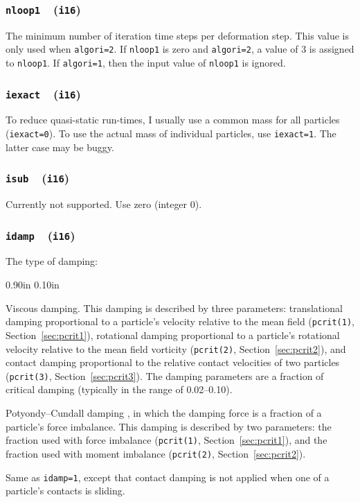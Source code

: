 \documentclass[letterpaper,11pt]{article}
\newcommand{\Var}[2]{\texttt{#1}\ \  (\texttt{#2})}
\newlength{\Labelwidth}
\newcommand{\Entrylabel}[1]{\makebox[\Labelwidth][r]{\texttt{#1}}}
\newenvironment{Options}
{\begin{list}{}{%
\renewcommand{\makelabel}{\Entrylabel}%
\setlength{\leftmargin} {0.90in}%
\setlength{\rightmargin}{0.00in}%
\setlength{\labelsep}   {0.10in}%
\setlength{\labelwidth} {\Labelwidth}%
}}
{\end{list}}
\begin{document}
\subsubsection[\texttt{nloop1}]{\Var{nloop1}{i16}}\label{sec:nloop1}
The minimum number of iteration time steps per deformation step.  
This value is only used when \texttt{algori=2}.  If \texttt{nloop1}
is zero and \texttt{algori=2}, a value of 3 is assigned to \texttt{nloop1}.
If \texttt{algori=1}, then the input value of \texttt{nloop1} is ignored.
%
\subsubsection[\texttt{iexact}]{\Var{iexact}{i16}}\label{sec:iexact}
To reduce quasi-static run-times,
I usually use a common mass for all particles (\texttt{iexact=0}).
To use the actual mass of individual particles,
use \texttt{iexact=1}.
The latter case may be buggy.
%
\subsubsection[\texttt{isub}]{\Var{isub}{i16}}\label{sec:isub}
Currently not supported.
Use zero (integer 0).
%
\subsubsection[\texttt{idamp}]{\Var{idamp}{i16}}\label{sec:idamp}
The type of damping:
\begin{Options}
  \item[idamp=0,1]
  Viscous damping.
  This damping is described by three parameters:
  translational damping proportional
  to a particle's velocity relative to the mean field
  (\texttt{pcrit(1)}, Section~\ref{sec:pcrit1}),
  rotational damping proportional to a particle's
  rotational velocity relative to the mean field vorticity
  (\texttt{pcrit(2)}, Section~\ref{sec:pcrit2}),
  and contact damping proportional to the relative contact
  velocities of two particles
  (\texttt{pcrit(3)}, Section~\ref{sec:pcrit3}).
  The damping parameters are a fraction of critical damping
  (typically in the range of 0.02--0.10).
  \item[idamp=2]
  Potyondy--Cundall damping \citep{Potyondy:2004a},
  in which the damping force is a fraction of a
  particle's force imbalance.
  This damping is described by two parameters:
  the fraction used with force imbalance  (\texttt{pcrit(1)}, Section~\ref{sec:pcrit1}),
  and the fraction used with moment imbalance
  (\texttt{pcrit(2)}, Section~\ref{sec:pcrit2}).
  \item[idamp=3]
  Same as \texttt{idamp=1}, except that contact damping
  is not applied when one of a particle's contacts is sliding.
\end{Options}
%
\end{document}
